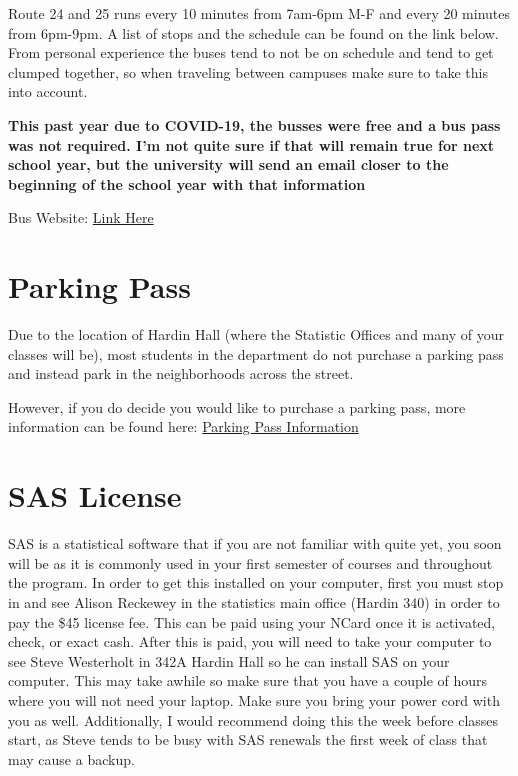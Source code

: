 \documentclass[
  12pt,
]{book}
\begin{document}
Route 24 and 25 runs every 10 minutes from 7am-6pm M-F and every 20 minutes from 6pm-9pm. A list of stops and the schedule can be found on the link below. From personal experience the buses tend to not be on schedule and tend to get clumped together, so when traveling between campuses make sure to take this into account.

\textbf{This past year due to COVID-19, the busses were free and a bus pass was not required. I'm not quite sure if that will remain true for next school year, but the university will send an email closer to the beginning of the school year with that information}

Bus Website: \href{https://parking.unl.edu/campus-bus-service}{Link Here}

\hypertarget{parking-pass}{%
\section{Parking Pass}\label{parking-pass}}

Due to the location of Hardin Hall (where the Statistic Offices and many of your classes will be), most students in the department do not purchase a parking pass and instead park in the neighborhoods across the street.

However, if you do decide you would like to purchase a parking pass, more information can be found here: \href{https://parking.unl.edu/}{Parking Pass Information}

\hypertarget{sas-license}{%
\section{SAS License}\label{sas-license}}

SAS is a statistical software that if you are not familiar with quite yet, you soon will be as it is commonly used in your first semester of courses and throughout the program. In order to get this installed on your computer, first you must stop in and see Alison Reckewey in the statistics main office (Hardin 340) in order to pay the \$45 license fee. This can be paid using your NCard once it is activated, check, or exact cash. After this is paid, you will need to take your computer to see Steve Westerholt in 342A Hardin Hall so he can install SAS on your computer. This may take awhile so make sure that you have a couple of hours where you will not need your laptop. Make sure you bring your power cord with you as well. Additionally, I would recommend doing this the week before classes start, as Steve tends to be busy with SAS renewals the first week of class that may cause a backup.
\end{document}
